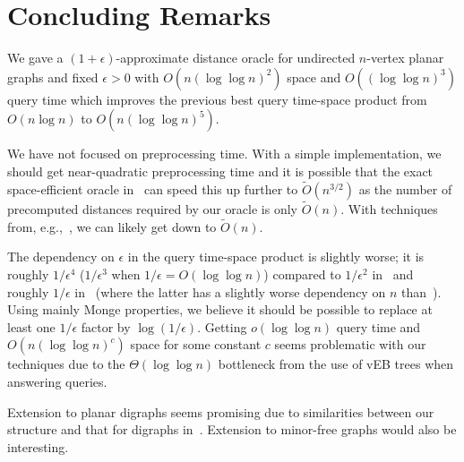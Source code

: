 \documentclass[11pt]{article}
\begin{document}
\section{Concluding Remarks}\label{sec:ConclRem}
We gave a $(1+\epsilon)$-approximate distance oracle for undirected $n$-vertex planar graphs and fixed $\epsilon > 0$ with $O(n(\log\log n)^2)$ space and $O((\log\log n)^3)$ query time which improves the previous best query time-space product from $O(n\log n)$ to $O(n(\log\log n)^5)$.

We have not focused on preprocessing time. With a simple implementation, we should get near-quadratic preprocessing time and it is possible that the exact space-efficient oracle in~\cite{ExactOraclePlanarMozesSommer} can speed this up further to $\tilde O(n^{3/2})$ as the number of precomputed distances required by our oracle is only $\tilde O(n)$. With techniques from, e.g.,~\cite{OraclePlanarKlein, OraclePlanarThorup}, we can likely get down to $\tilde O(n)$.

The dependency on $\epsilon$ in the query time-space product is slightly worse; it is roughly $1/\epsilon^4$ ($1/\epsilon^3$ when $1/\epsilon = O(\log\log n)$) compared to $1/\epsilon^2$ in~\cite{OraclePlanarKlein, OraclePlanarThorup} and roughly $1/\epsilon$ in~\cite{CompactOraclesPlanar} (where the latter has a slightly worse dependency on $n$ than~\cite{OraclePlanarKlein, OraclePlanarThorup}). Using mainly Monge properties, we believe it should be possible to replace at least one $1/\epsilon$ factor by $\log(1/\epsilon)$. Getting $o(\log\log n)$ query time and $O(n(\log\log n)^c)$ space for some constant $c$ seems problematic with our techniques due to the $\Theta(\log\log n)$ bottleneck from the use of vEB trees when answering queries.

Extension to planar digraphs seems promising due to similarities between our structure and that for digraphs in~\cite{OraclePlanarThorup}. Extension to minor-free graphs would also be interesting.
\end{document}
